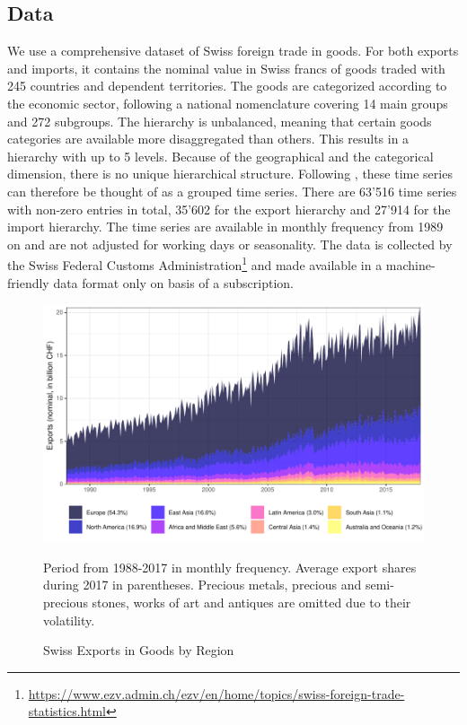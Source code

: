 \documentclass[a4paper,fleqn,11pt]{article}
\begin{document}
\subsection{Data}
We use a comprehensive dataset of Swiss foreign trade in goods. For both exports and imports, it contains the nominal value in Swiss francs of goods traded with 245 countries and dependent territories. The goods are categorized according to the economic sector, following a national nomenclature covering 14 main groups and 272 subgroups. The hierarchy is unbalanced, meaning that certain goods categories are available more disaggregated than others. This results in a hierarchy with up to 5 levels. Because of the geographical and the categorical dimension, there is no unique hierarchical structure. Following \cite{Hyndman2016}, these time series can therefore be thought of as a grouped time series. There are 63'516 time series with non-zero entries in total, 35'602 for the export hierarchy and 27'914 for the import hierarchy. The time series are available in monthly frequency from 1989 on and are not adjusted for working days or seasonality. The data is collected by the Swiss Federal Customs Administration\footnote{\url{https://www.ezv.admin.ch/ezv/en/home/topics/swiss-foreign-trade-statistics.html}} and made available in a machine-friendly data format only on basis of a subscription.\\
\begin{figure}[H]
	\includegraphics[width=\textwidth]{fig/fig_area_reg}
	\caption{Swiss Exports in Goods by Region}
	\footnotesize{Period from 1988-2017 in monthly frequency. Average export shares during 2017 in parentheses. Precious metals, precious and semi-precious stones, works of art and antiques are omitted due to their volatility.}
\end{figure}
\end{document}
